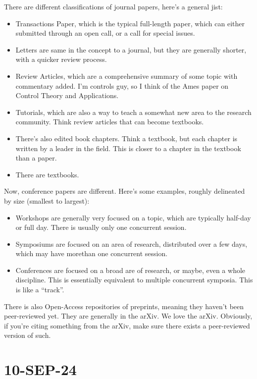 \documentclass[10pt, oneside]{article}
\begin{document}
There are different classifications of journal papers, here's a general jist:
\begin{itemize}
    \item Transactions Paper, which is the typical full-length paper, which can either submitted through an open call, or a call for special issues.
    \item Letters are same in the concept to a journal, but they are generally shorter, with a quicker review process. 
    \item Review Articles, which are a comprehensive summary of some topic with commentary added. I'm controls guy, so I think of the Ames paper on Control Theory and Applications.
    \item Tutorials, which are also a way to teach a somewhat new area to the research community. Think review articles that can become textbooks. 
    \item There's also edited book chapters. Think a textbook, but each chapter is written by a leader in the field. This is closer to a chapter in the textbook than a paper. 
    \item There are textbooks. 
\end{itemize}

Now, conference papers are different. Here's some examples, roughly delineated by size (smallest to largest):
\begin{itemize}
    \item Workshops are generally very focused on a topic, which are typically half-day or full day. There is usually only one concurrent session.
    \item Symposiums are focused on an area of research, distributed over a few days, which may have morethan one concurrent session.
    \item Conferences are focused on a broad are of research, or maybe, even a whole discipline. This is essentially equivalent to multiple concurrent symposia. This is like a ``track''.
\end{itemize}

There is also Open-Access repositories of preprints, meaning they haven't been peer-reviewed yet. They are generally in the arXiv. We love the arXiv. Obviously, if you're citing something from the arXiv, make sure there exists a peer-reviewed version of such. 
\section{10-SEP-24}
\end{document}
